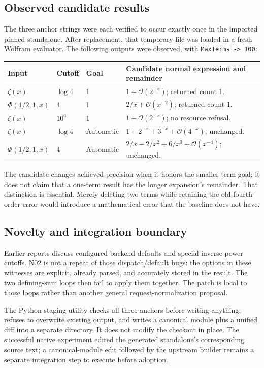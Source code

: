 \documentclass[11pt,letterpaper]{article}
\newcommand{\code}[1]{\nolinkurl{#1}}
\newcommand{\OO}{\mathcal O}
\begin{document}
\subsection{Observed candidate results}
The three anchor strings were each verified to occur exactly once in the
imported pinned standalone. After replacement, that temporary file was loaded
in a fresh Wolfram evaluator. The following outputs were observed, with
\code{MaxTerms -> 100}:
\begin{longtable}{@{}P{0.24\textwidth}P{0.16\textwidth}P{0.12\textwidth}P{0.39\textwidth}@{}}
\toprule
Input & Cutoff & Goal & Candidate normal expression and remainder\\\midrule\endhead
$\zeta(x)$ & $\log4$ & 1 & $1+\OO(2^{-x})$; returned count 1.\\
$\Phi(1/2,1,x)$ & 4 & 1 & $2/x+\OO(x^{-2})$; returned count 1.\\
$\zeta(x)$ & $10^6$ & 1 & $1+\OO(2^{-x})$; no resource refusal.\\
$\zeta(x)$ & $\log4$ & Automatic & $1+2^{-x}+3^{-x}+\OO(4^{-x})$; unchanged.\\
$\Phi(1/2,1,x)$ & 4 & Automatic & $2/x-2/x^2+6/x^3+\OO(x^{-4})$; unchanged.\\
\bottomrule
\end{longtable}

The candidate changes achieved precision when it honors the smaller term goal;
it does not claim that a one-term result has the longer expansion's remainder.
That distinction is essential. Merely deleting two terms while retaining the
old fourth-order error would introduce a mathematical error that the baseline
does not have.

\subsection{Novelty and integration boundary}
Earlier reports discuss configured backend defaults and special inverse power
cutoffs. N02 is not a repeat of those dispatch/default bugs: the options in
these witnesses are explicit, already parsed, and accurately stored in the
result. The two defining-sum loops then fail to apply them together. The patch
is local to those loops rather than another general request-normalization
proposal.~\cite{wave3,wave5}

The Python staging utility checks all three anchors before writing anything,
refuses to overwrite existing output, and writes a canonical module plus a
unified diff into a separate directory. It does not modify the checkout in
place. The successful native experiment edited the generated standalone's
corresponding source text; a canonical-module edit followed by the upstream
builder remains a separate integration step to execute before adoption.
\end{document}
